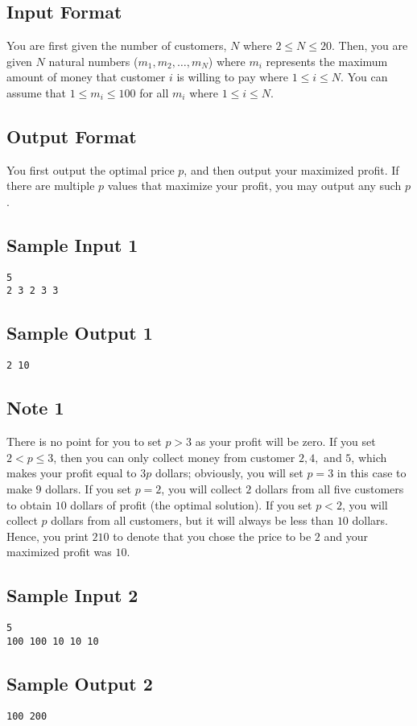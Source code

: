 \subsection*{Input Format}
You are first given the number of customers, $N$ where $2 \leq N \leq 20$. Then, you are given $N$ natural numbers ($m_1, m_2, \dots, m_N$) where $m_i$ represents the maximum amount of money that customer $i$ is willing to pay where $1 \leq i \leq N$. You can assume that $1 \leq m_i \leq 100$ for all $m_i$ where $1 \leq i \leq N$. 

\subsection*{Output Format}
You first output the optimal price $p$, and then output your maximized profit. If there are multiple $p$ values that maximize your profit, you may output any such $p$. 

\subsection*{Sample Input 1}
\begin{verbatim}
5
2 3 2 3 3
\end{verbatim}
\subsection*{Sample Output 1}
\begin{verbatim}
2 10
\end{verbatim}

\subsection*{Note 1}
There is no point for you to set $p > 3$ as your profit will be zero. If you set $2 < p \leq 3$, then you can only collect money from customer $2, 4,$ and $5$, which makes your profit equal to $3p$ dollars; obviously, you will set $p = 3$ in this case to make $9$ dollars. 
If you set $p = 2$, you will collect $2$ dollars from all five customers to obtain $10$ dollars of profit (the optimal solution).
If you set $p < 2$, you will collect $p$ dollars from all customers, but it will always be less than $10$ dollars. 
Hence, you print $2 10$ to denote that you chose the price to be $2$ and your maximized profit was $10$. 

\subsection*{Sample Input 2}
\begin{verbatim}
5
100 100 10 10 10
\end{verbatim}
\subsection*{Sample Output 2}
\begin{verbatim}
100 200
\end{verbatim}


